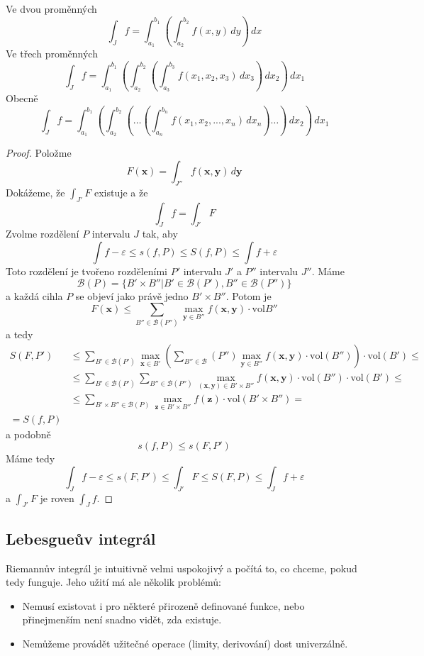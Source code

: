 \documentclass[../main.tex]{subfiles}
\begin{document}
\begin{example}
	Ve dvou proměnných
	\[ \int_{J} f = \int_{a_1}^{b_1} \left( \int_{a_2}^{b_2} f(x,y) \,dy \right) \,dx \]
	Ve třech proměnných
	\[ \int_{J} f =
	\int_{a_1}^{b_1} \left(
	\int_{a_2}^{b_2} \left(
	\int_{a_3}^{b_3} f(x_1, x_2, x_3) \,dx_3 \right) \,dx_2 \right) \,dx_1 \]
	Obecně
	\[ \int_{J} f =
	\int_{a_1}^{b_1} \left(
	\int_{a_2}^{b_2} \left(
	\dots \left(
	\int_{a_n}^{b_n} f(x_1, x_2, ..., x_n) \,dx_n \right) \dots \right) \,dx_2 \right) \,dx_1 \]
\end{example}

\begin{proof}
	Položme
	\[ F(\mathbf{x}) = \int_{J''} f(\mathbf{x}, \mathbf{y}) \,d\mathbf{y} \]
	Dokážeme, že $\int_{J'} F$ existuje a že
	\[ \int_{J} f = \int_{J'} F \]
	Zvolme rozdělení $P$ intervalu $J$ tak, aby
	\[ \int f - \varepsilon \leq s(f,P) \leq S(f,P) \leq \int f + \varepsilon \]
	Toto rozdělení je tvořeno rozděleními $P'$ intervalu $J'$ a $P''$ intervalu $J''$. Máme
	\[ \mathcal{B}(P) = \{ B' \times B'' | B' \in \mathcal{B}(P'), B'' \in \mathcal{B}(P'') \} \]
	a každá cihla $P$ se objeví jako právě jedno $B' \times B''$. Potom je
	\[ F(\mathbf{x}) \leq \sum_{B''\in \mathcal{B}(P'')}
	\max_{\mathbf{y} \in B''} f(\mathbf{x}, \mathbf{y}) \cdot \textrm{vol}B'' \]
	a tedy
	\begin{align*}
	    S(F, P')
	    &\leq \sum_{B' \in \mathcal{B}(P')} \max_{\mathbf{x}\in B'}
	    \left( \sum_{B'' \in \mathcal{B}}(P'') \max_{\mathbf{y}\in B''}
	    f(\mathbf{x}, \mathbf{y}) \cdot \textrm{vol}(B'')\right) \cdot \textrm{vol}(B') \leq\\
	    &\leq \sum_{B' \in \mathcal{B}(P')} \sum_{B'' \in \mathcal{B}(P'')}
	    \max_{(\mathbf{x}, \mathbf{y}) \in B' \times B''} f(\mathbf{x}, \mathbf{y})
	    \cdot \textrm{vol}(B'') \cdot \textrm{vol}(B') \leq\\
	    &\leq \sum_{B' \times B'' \in \mathcal{B}(P)} \max_{\mathbf{z}\in B' \times B''}
	    f(\mathbf{z}) \cdot \textrm{vol}(B' \times B'') =\\
	    = S(f,P)
	\end{align*}
	a podobně
	\[ s(f,P) \leq s(F,P') \]
	Máme tedy
	\[ \int_{J} f - \varepsilon \leq s(F,P') \leq \int_{J'} F \leq S(F,P) \leq \int_{J} f + \varepsilon \]
	a $\int_{J'} F$ je roven $\int_{J} f$.
\end{proof}

\subsection{Lebesgueův integrál}
Riemannův integrál je intuitivně velmi uspokojivý a počítá to, co chceme, pokud tedy funguje.
Jeho užití má ale několik problémů:
\begin{itemize}
    \item Nemusí existovat i pro některé přirozeně definované funkce, nebo
    přinejmenším není snadno vidět, zda existuje.
    \item Nemůžeme provádět užitečné operace (limity, derivování) dost univerzálně.
\end{itemize}
\end{document}
